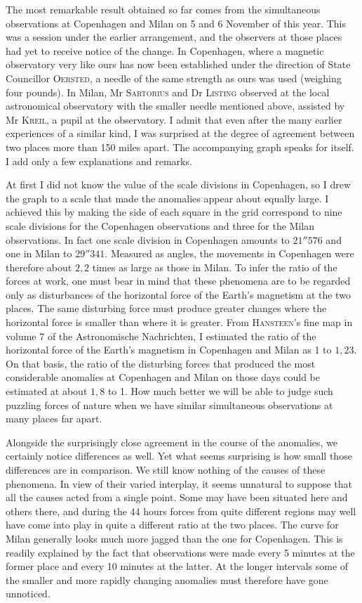 The most remarkable result obtained so far comes from the simultaneous observations at Copenhagen and Milan on 5 and 6 November of this year. This was a session under the earlier arrangement, and the observers at those places had yet to receive notice of the change. In Copenhagen, where a magnetic observatory very like ours has now been established under the direction of State Councillor \textsc{Oersted}, a needle of the same strength as ours was used (weighing four pounds). In Milan, Mr \textsc{Sartorius} and Dr \textsc{Listing} observed at the local astronomical observatory with the smaller needle mentioned above, assisted by Mr \textsc{Kreil}, a pupil at the observatory. I admit that even after the many earlier experiences of a similar kind, I was surprised at the degree of agreement between two places more than 150 miles apart. The accompanying graph speaks for itself. I add only a few explanations and remarks.

At first I did not know the value of the scale divisions in Copenhagen, so I drew the graph to a scale that made the anomalies appear about equally large. I achieved this by making the side of each square in the grid correspond to nine scale divisions for the Copenhagen observations and three for the Milan observations. In fact one scale division in Copenhagen amounts to $21''576$ and one in Milan to $29''341$. Measured as angles, the movements in Copenhagen were therefore about $2{,}2$ times as large as those in Milan. To infer the ratio of the forces at work, one must bear in mind that these phenomena are to be regarded only as disturbances of the horizontal force of the Earth's magnetism at the two places. The same disturbing force must produce greater changes where the horizontal force is smaller than where it is greater. From \textsc{Hansteen}'s fine map in volume 7 of the Astronomische Nachrichten, I estimated the ratio of the horizontal force of the Earth's magnetism in Copenhagen and Milan as
1 to $1{,}23$. On that basis, the ratio of the disturbing forces that produced the most considerable anomalies at Copenhagen and Milan on those days could be estimated at about $1{,}8$ to 1. How much better we will be able to judge such puzzling forces of nature when we have similar simultaneous observations at many places far apart.

Alongside the surprisingly close agreement in the course of the anomalies, we certainly notice differences as well. Yet what seems surprising is how small those differences are in comparison. We still know nothing of the causes of these phenomena. In view of their varied interplay, it seems unnatural to suppose that all the causes acted from a single point. Some may have been situated here and others there, and during the 44 hours forces from quite different regions may well have come into play in quite a different ratio at the two places. The curve for Milan generally looks much more jagged than the one for Copenhagen. This is readily explained by the fact that observations were made every 5 minutes at the former place and every 10 minutes at the latter. At the longer intervals some of the smaller and more rapidly changing anomalies must therefore have gone unnoticed.

